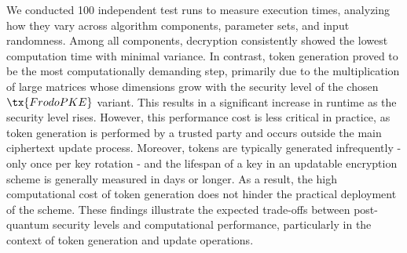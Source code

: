 \documentclass{fundam}
\begin{document}
We conducted 100 independent test runs to measure execution times, analyzing how they vary across algorithm components, parameter sets, and input randomness. Among all components, decryption consistently showed the lowest computation time with minimal variance. In contrast, token generation proved to be the most computationally demanding step, primarily due to the multiplication of large matrices whose dimensions grow with the security level of the chosen $\tx{FrodoPKE}$ variant. This results in a significant increase in runtime as the security level rises. However, this performance cost is less critical in practice, as token generation is performed by a trusted party and occurs outside the main ciphertext update process. Moreover, tokens are typically generated infrequently - only once per key rotation - and the lifespan of a key in an updatable encryption scheme is generally measured in days or longer. As a result, the high computational cost of token generation does not hinder the practical deployment of the scheme. These findings illustrate the expected trade-offs between post-quantum security levels and computational performance, particularly in the context of token generation and update operations.
\nocite{*}



\end{document}

